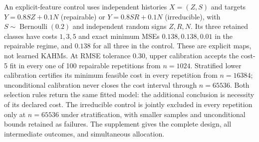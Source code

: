 An explicit-feature control uses independent histories $X=(Z,S)$ and targets
$Y=0.8SZ+0.1N$ (repairable) or $Y=0.8SR+0.1N$ (irreducible), with
$S\sim\operatorname{Bernoulli}(0.2)$ and independent random signs $Z,R,N$.
Its three retained classes have costs $1,3,5$ and exact minimum MSEs
$0.138,0.138,0.01$ in the repairable regime, and $0.138$ for all three
in the control. These are explicit maps, not learned KAHMs.
At RMSE tolerance $0.30$, upper calibration accepts the cost-5 fit in every
one of 100 repairable repetitions from $n=1024$. Stratified lower calibration
certifies its minimum feasible cost in every repetition from $n=16384$;
unconditional calibration never closes the cost interval through $n=65536$.
Both selection rules return the same fitted model: the additional conclusion
is necessity of its declared cost. The irreducible control is jointly excluded
in every repetition only at $n=65536$ under stratification, with smaller
samples and unconditional bounds retained as failures. The supplement gives
the complete design, all intermediate outcomes, and simultaneous allocation.
